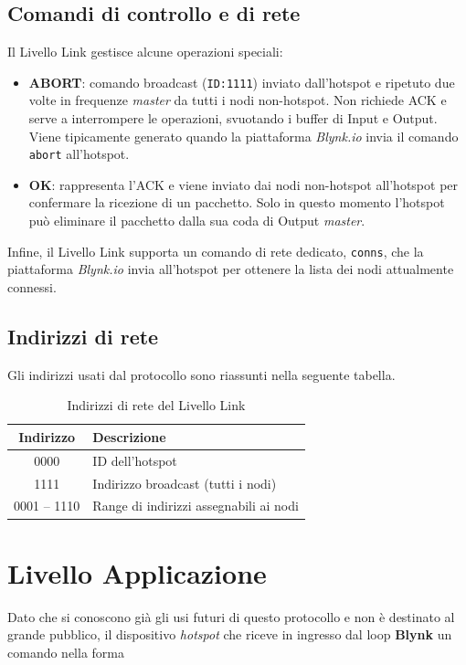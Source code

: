 \subsection{Comandi di controllo e di rete}

Il Livello Link gestisce alcune operazioni speciali:  
\begin{itemize}
  \item \textbf{ABORT}: comando broadcast (\texttt{ID:1111}) inviato dall’hotspot e ripetuto due volte in frequenze \emph{master} da tutti i nodi non-hotspot. Non richiede ACK e serve a interrompere le operazioni, svuotando i buffer di Input e Output. 
  Viene tipicamente generato quando la piattaforma \emph{Blynk.io} invia il comando \texttt{abort} all’hotspot.
  \item \textbf{OK}: rappresenta l’ACK e viene inviato dai nodi non-hotspot all’hotspot per confermare la ricezione di un pacchetto. 
  Solo in questo momento l’hotspot può eliminare il pacchetto dalla sua coda di Output \emph{master}.
\end{itemize}

Infine, il Livello Link supporta un comando di rete dedicato, \texttt{conns}, che la piattaforma \emph{Blynk.io} invia all’hotspot per ottenere la lista dei nodi attualmente connessi.  

\subsection{Indirizzi di rete}

Gli indirizzi usati dal protocollo sono riassunti nella seguente tabella.  

\begin{table}[H]
\centering
\begin{tabular}{|c|l|}
\hline
\textbf{Indirizzo} & \textbf{Descrizione} \\
\hline
0000 & ID dell'hotspot \\
1111 & Indirizzo broadcast (tutti i nodi) \\
0001 -- 1110 & Range di indirizzi assegnabili ai nodi \\
\hline
\end{tabular}
\caption{Indirizzi di rete del Livello Link}
\label{tab:indirizzi}
\end{table}

\section{Livello Applicazione}
Dato che si conoscono già gli usi futuri di questo protocollo e non è destinato al grande pubblico, 
il dispositivo \textit{hotspot} che riceve in ingresso dal loop \textbf{Blynk} un comando nella forma

